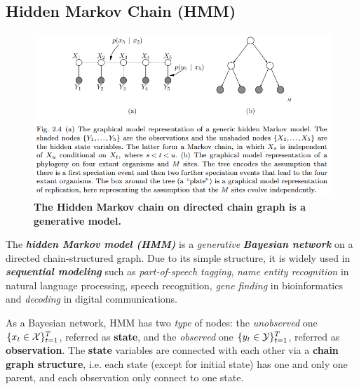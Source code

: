 \documentclass[11pt]{article}
\begin{document}
\subsection{Hidden Markov Chain (HMM)}
\begin{figure}
\begin{minipage}[t]{1\linewidth}
  \centering
  \centerline{\includegraphics[scale = 0.45]{hmm.png}}
\end{minipage}
\caption{\footnotesize{\textbf{The Hidden Markov chain on directed chain graph is a generative model.}}}
\label{fig: hmm}
\end{figure}

The \textbf{\emph{hidden Markov model (HMM)}} is a \emph{generative} \emph{\textbf{Bayesian network}} on a directed chain-structured graph. Due to its simple structure, it is widely used in \emph{\textbf{sequential modeling}} such as \emph{part-of-speech tagging}, \emph{name entity recognition} in natural language processing, speech recognition, \emph{gene finding} in bioinformatics and \emph{decoding} in digital communications.

As a Bayesian network, HMM has two \emph{type} of nodes: the \emph{unobserved} one $\{x_t \in {\mathcal X}\}_{t=1}^{T}$, referred as \textbf{state}, and the \emph{observed} one $\{y_t \in {\mathcal Y}\}_{t=1}^{T}$, referred as \textbf{observation}. The \textbf{state} variables are connected with each other via a \textbf{chain graph structure}, i.e. each state (except for initial state) has one and only one parent, and each observation only connect to one state. 
\end{document}
